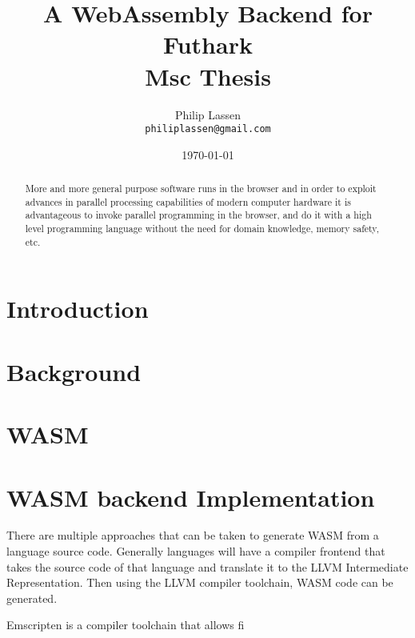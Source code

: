 \documentclass[11pt]{article}
\title{
  \vspace{3cm}
  \Huge{A WebAssembly Backend for Futhark} \\
  \Large{Msc Thesis}
}
\author{
  \Large{Philip Lassen}
  \\ \texttt{philiplassen@gmail.com} \\
}
\date{
    \today
}
\def \ColourPDF {include/natbio-farve}
\def \TitlePDF   {include/nat-en}  %
\begin{document}


\clearpage\maketitle
\thispagestyle{empty}

\newpage


\begin{abstract}
More and more general purpose software runs in the browser and in order to exploit advances in parallel processing capabilities of modern computer hardware it is advantageous to invoke parallel programming in the browser, and do it with a high level programming language without the need for domain knowledge, memory safety, etc.
\end{abstract}


\newpage
\tableofcontents
\newpage

\section{Introduction}

\section{Background}

\section{WASM}

\newpage


\section{WASM backend Implementation}

There are multiple approaches that can be taken to generate WASM from a language source code. Generally languages will have a compiler frontend that takes the source code of that language and translate it to the LLVM Intermediate Representation. Then using the LLVM compiler toolchain, WASM code can be generated. 


Emscripten is a compiler toolchain that allows fi
\end{document}
